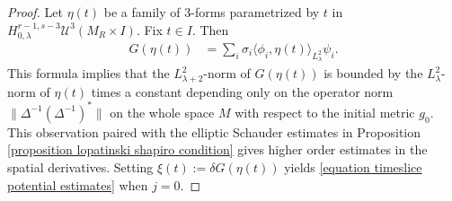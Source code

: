 \documentclass[10pt,a4paper]{amsart}
\newcommand{\De}{\Delta}
\newcommand{\de}{\delta}
\newcommand{\la}{\lambda}
\newcommand{\sU}{{\mathscr U}}
\newcommand{\sg}{\sigma}
\begin{document}
\begin{proof}
Let $\eta(t)$ be a family of 3-forms parametrized by $t$ in $H_{0,\la}^{r-1,s-3}\sU^3(M_R \times I)$. Fix $t \in I$. Then
\begin{align*}
    G(\eta(t)) &= \sum_i \sg_i \langle \phi_i, \eta(t) \rangle_{L^2_\la} \psi_i.
\end{align*}
This formula implies that the $L^2_{\la+2}$-norm of $G(\eta(t))$ is bounded by the $L^2_{\la}$-norm of $\eta(t)$ times a constant depending only on the operator norm $\|\De^{-1}(\De^{-1})^*\|$ on the whole space $M$ with respect to the initial metric $g_0$. This observation paired with the elliptic Schauder estimates in Proposition \ref{proposition lopatinski shapiro condition} gives higher order estimates in the spatial derivatives. Setting $\xi(t) := \de G( \eta(t))$ yields \eqref{equation timeslice potential estimates} when $j = 0$.


\end{proof}
\end{document}
